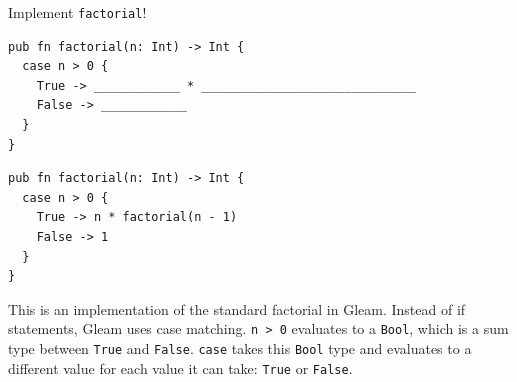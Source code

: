 \begin{blocksection}
\question Implement \texttt{factorial}!
\begin{lstlisting}
pub fn factorial(n: Int) -> Int {
  case n > 0 {
    True -> ____________ * ______________________________
    False -> ____________
  }
}
\end{lstlisting}
\begin{solution}
\begin{lstlisting}
pub fn factorial(n: Int) -> Int {
  case n > 0 {
    True -> n * factorial(n - 1)
    False -> 1
  }
}

\end{lstlisting}
\end{solution}

\begin{questionmeta}
  This is an implementation of the standard factorial in Gleam. Instead of if statements, Gleam uses case matching.
  \lstinline{n > 0} evaluates to a \lstinline{Bool}, which is a sum type between \lstinline{True} and \lstinline{False}. 
  \lstinline{case} takes this \lstinline{Bool} type and evaluates to a different value for each value it can take: \lstinline{True} or \lstinline{False}.
\end{questionmeta}
\end{blocksection}